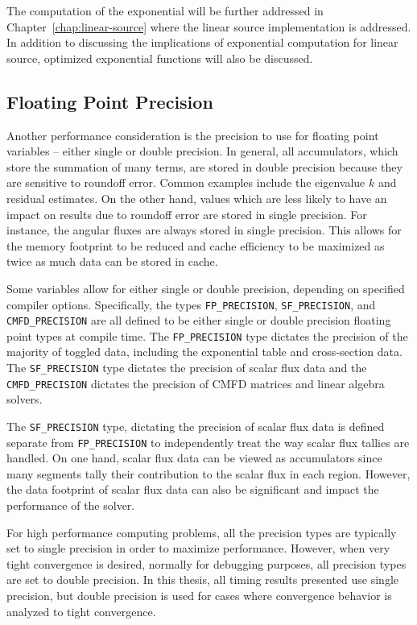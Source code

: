 The computation of the exponential will be further addressed in Chapter~\ref{chap:linear-source} where the linear source implementation is addressed. In addition to discussing the implications of exponential computation for linear source, optimized exponential functions will also be discussed.

\subsection{Floating Point Precision}

Another performance consideration is the precision to use for floating point variables -- either single or double precision. In general, all accumulators, which store the summation of many terms, are stored in double precision because they are sensitive to roundoff error. Common examples include the eigenvalue $k$ and residual estimates. On the other hand, values which are less likely to have an impact on results due to roundoff error are stored in single precision.  For instance, the angular fluxes are always stored in single precision. This allows for the memory footprint to be reduced and cache efficiency to be maximized as twice as much data can be stored in cache.

Some variables allow for either single or double precision, depending on specified compiler options. Specifically, the types \texttt{FP_PRECISION}, \texttt{SF_PRECISION}, and \texttt{CMFD_PRECISION} are all defined to be either single or double precision floating point types at compile time. The \texttt{FP_PRECISION} type dictates the precision of the majority of toggled data, including the exponential table and cross-section data.  The \texttt{SF_PRECISION} type dictates the precision of scalar flux data and the \texttt{CMFD_PRECISION} dictates the precision of CMFD matrices and linear algebra solvers.

The \texttt{SF_PRECISION} type, dictating the precision of scalar flux data is defined separate from \texttt{FP_PRECISION} to independently treat the way scalar flux tallies are handled. On one hand, scalar flux data can be viewed as accumulators since many segments tally their contribution to the scalar flux in each region. However, the data footprint of scalar flux data can also be significant and impact the performance of the solver.

For high performance computing problems, all the precision types are typically set to single precision in order to maximize performance. However, when very tight convergence is desired, normally for debugging purposes, all precision types are set to double precision. In this thesis, all timing results presented use single precision, but double precision is used for cases where convergence behavior is analyzed to tight convergence.

